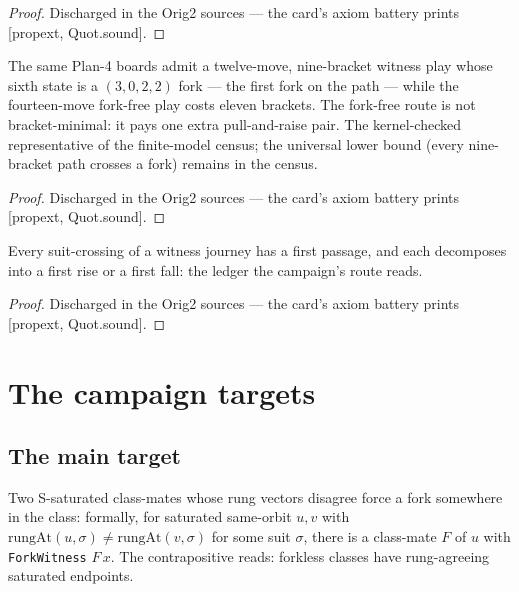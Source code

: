 \begin{proof}
\leanok
Discharged in the Orig2 sources --- the card's axiom battery prints [propext, Quot.sound].
\end{proof}

\begin{theorem}\label{thm:minPath}
\leanok
{}
The same Plan-4 boards admit a twelve-move, nine-bracket witness
play whose sixth state is a $(3,0,2,2)$ fork --- the first fork
on the path --- while the fourteen-move fork-free play costs
eleven brackets.  The fork-free route is not bracket-minimal: it
pays one extra pull-and-raise pair.  The kernel-checked
representative of the finite-model census; the universal lower
bound (every nine-bracket path crosses a fork) remains in the
census.
\end{theorem}

\begin{proof}
\leanok
Discharged in the Orig2 sources --- the card's axiom battery prints [propext, Quot.sound].
\end{proof}

\begin{theorem}\label{thm:firstPassage}
\leanok
{}
Every suit-crossing of a witness journey has a first passage, and
each decomposes into a first rise or a first fall: the ledger the
campaign's route reads.
\end{theorem}

\begin{proof}
\leanok
Discharged in the Orig2 sources --- the card's axiom battery prints [propext, Quot.sound].
\end{proof}

\chapter{The campaign targets}
\label{chap:campaign}

\section{The main target}

\begin{theorem}\label{thm:satDifferFork}
\leanok
{}
Two S-saturated class-mates whose rung vectors disagree force a
fork somewhere in the class: formally, for saturated same-orbit
$u, v$ with $\mathrm{rungAt}(u, \sigma) \ne \mathrm{rungAt}(v,
\sigma)$ for some suit $\sigma$, there is a class-mate $F$ of
$u$ with \texttt{ForkWitness} $F\,x$.  The contrapositive reads:
forkless classes have rung-agreeing saturated endpoints.
\end{theorem}

